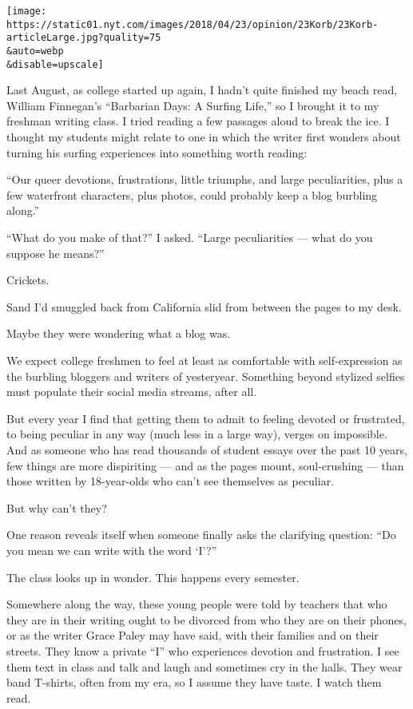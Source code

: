 \texttt{[image: https://static01.nyt.com/images/2018/04/23/opinion/23Korb/23Korb-articleLarge.jpg?quality=75\\\&auto=webp\\\&disable=upscale]}

Last August, as college started up again, I hadn't quite finished my
beach read, William Finnegan's ``Barbarian Days: A Surfing Life,'' so I
brought it to my freshman writing class. I tried reading a few passages
aloud to break the ice. I thought my students might relate to one in
which the writer first wonders about turning his surfing experiences
into something worth reading:

``Our queer devotions, frustrations, little triumphs, and large
peculiarities, plus a few waterfront characters, plus photos, could
probably keep a blog burbling along.''

``What do you make of that?'' I asked. ``Large peculiarities --- what do
you suppose he means?''

Crickets.

Sand I'd smuggled back from California slid from between the pages to my
desk.

Maybe they were wondering what a blog was.

We expect college freshmen to feel at least as comfortable with
self-expression as the burbling bloggers and writers of yesteryear.
Something beyond stylized selfies must populate their social media
streams, after all.

But every year I find that getting them to admit to feeling devoted or
frustrated, to being peculiar in any way (much less in a large way),
verges on impossible. And as someone who has read thousands of student
essays over the past 10 years, few things are more dispiriting --- and
as the pages mount, soul-crushing --- than those written by 18-year-olds
who can't see themselves as peculiar.

But why can't they?

One reason reveals itself when someone finally asks the clarifying
question: ``Do you mean we can write with the word `I'?''

The class looks up in wonder. This happens every semester.

Somewhere along the way, these young people were told by teachers that
who they are in their writing ought to be divorced from who they are on
their phones, or as the writer Grace Paley may have said, with their
families and on their streets. They know a private ``I'' who experiences
devotion and frustration. I see them text in class and talk and laugh
and sometimes cry in the halls. They wear band T-shirts, often from my
era, so I assume they have taste. I watch them read.

